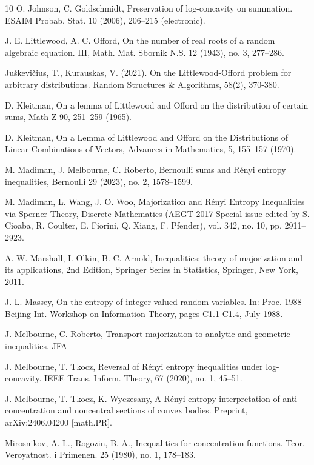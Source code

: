 \documentclass[11pt]{article}
\newcommand{\1}{[1]}
\begin{document}
\begin{thebibliography}{10}
 O. Johnson, C. Goldschmidt, Preservation of log-concavity on summation. ESAIM Probab. Stat. 10 (2006), 206--215 (electronic).

 J. E. Littlewood, A. C. Offord, On the number of real roots of a random algebraic equation. III, Math. Mat. Sbornik N.S. 12 (1943), no. 3, 277–286.

 Juškevičius, T., Kurauskas, V. (2021). On the Littlewood‐Offord problem for arbitrary distributions. Random Structures \& Algorithms, 58(2), 370-380.

 D. Kleitman, On a lemma of Littlewood and Offord on the distribution of certain sums, Math Z 90, 251–259 (1965).

 D. Kleitman, On a Lemma of Littlewood and Offord on the Distributions of Linear Combinations of Vectors, Advances in Mathematics, 5, 155--157 (1970).

 M. Madiman, J. Melbourne, C. Roberto, Bernoulli sums and Rényi entropy inequalities, Bernoulli 29 (2023), no. 2, 1578–1599.

 M. Madiman, L. Wang, J. O. Woo, Majorization and R\'enyi Entropy Inequalities via Sperner Theory, Discrete Mathematics (AEGT 2017 Special issue edited by S. Cioaba, R. Coulter, E. Fiorini, Q. Xiang, F. Pfender), vol. 342, no. 10, pp. 2911--2923.

 A. W. Marshall, I. Olkin, B. C. Arnold, Inequalities: theory of majorization and its applications, 2nd Edition, Springer Series in Statistics, Springer, New York, 2011.

 J. L. Massey, On the entropy of integer-valued random variables. In: Proc. 1988 Beijing Int. Workshop on
Information Theory, pages C1.1-C1.4, July 1988.

 J. Melbourne, C. Roberto, Transport-majorization to analytic and geometric inequalities. JFA

 J. Melbourne, T. Tkocz, Reversal of R\'enyi entropy inequalities under log-concavity. IEEE Trans. Inform. Theory, 67 (2020), no. 1, 45--51.

 J. Melbourne, T. Tkocz, K. Wyczesany, A Rényi entropy interpretation of anti-concentration and noncentral sections of convex bodies. Preprint, arXiv:2406.04200 [math.PR].


 Mirosnikov, A. L., Rogozin, B. A., Inequalities for concentration functions. Teor. Veroyatnost. i Primenen. 25 (1980), no. 1, 178--183.


\end{thebibliography}
\end{document}
